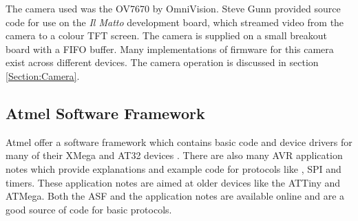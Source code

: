 The camera used was the OV7670 by OmniVision. Steve Gunn provided source code for use on the \textit{Il Matto} development board, which streamed video from the camera to a colour TFT screen. The camera is supplied on a small breakout board with a FIFO buffer. Many implementations of firmware for this camera exist across different devices. The camera operation is discussed in section \ref{Section:Camera}. 
\subsection{Atmel Software Framework}

Atmel offer a software framework which contains basic code and device drivers for many of their XMega and AT32 devices \citep{Atmel:ASF}. There are also many AVR application notes which provide explanations and example code for protocols like \itc , SPI and timers. These application notes are aimed at older devices like the ATTiny and ATMega. Both the ASF and the application notes are available online and are a good source of code for basic protocols.

%
%
%
%
%


